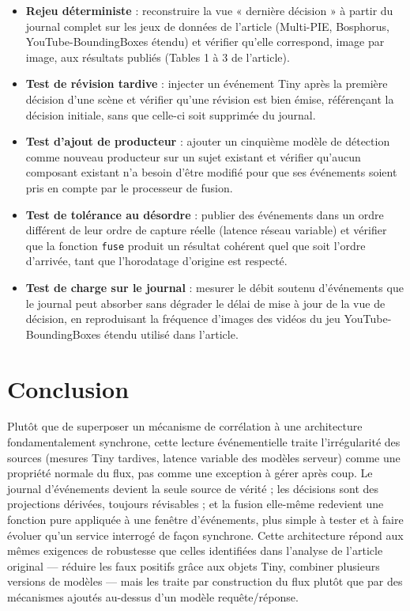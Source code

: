 \documentclass[11pt,a4paper]{article}
\begin{document}
\begin{itemize}[leftmargin=1.2cm]
  \item \textbf{Rejeu déterministe} : reconstruire la vue « dernière décision » à partir du
  journal complet sur les jeux de données de l'article (Multi-PIE, Bosphorus,
  YouTube-BoundingBoxes étendu) et vérifier qu'elle correspond, image par image, aux résultats
  publiés (Tables 1 à 3 de l'article).
  \item \textbf{Test de révision tardive} : injecter un événement Tiny après la première
  décision d'une scène et vérifier qu'une révision est bien émise, référençant la décision
  initiale, sans que celle-ci soit supprimée du journal.
  \item \textbf{Test d'ajout de producteur} : ajouter un cinquième modèle de détection comme
  nouveau producteur sur un sujet existant et vérifier qu'aucun composant existant n'a besoin
  d'être modifié pour que ses événements soient pris en compte par le processeur de fusion.
  \item \textbf{Test de tolérance au désordre} : publier des événements dans un ordre différent
  de leur ordre de capture réelle (latence réseau variable) et vérifier que la fonction
  \texttt{fuse} produit un résultat cohérent quel que soit l'ordre d'arrivée, tant que
  l'horodatage d'origine est respecté.
  \item \textbf{Test de charge sur le journal} : mesurer le débit soutenu d'événements que le
  journal peut absorber sans dégrader le délai de mise à jour de la vue de décision, en
  reproduisant la fréquence d'images des vidéos du jeu YouTube-BoundingBoxes étendu utilisé
  dans l'article.
\end{itemize}

\section{Conclusion}

Plutôt que de superposer un mécanisme de corrélation à une architecture fondamentalement
synchrone, cette lecture événementielle traite l'irrégularité des sources (mesures Tiny
tardives, latence variable des modèles serveur) comme une propriété normale du flux, pas comme
une exception à gérer après coup. Le journal d'événements devient la seule source de vérité ;
les décisions sont des projections dérivées, toujours révisables ; et la fusion elle-même
redevient une fonction pure appliquée à une fenêtre d'événements, plus simple à tester et à
faire évoluer qu'un service interrogé de façon synchrone. Cette architecture répond aux mêmes
exigences de robustesse que celles identifiées dans l'analyse de l'article original --- réduire
les faux positifs grâce aux objets Tiny, combiner plusieurs versions de modèles --- mais les
traite par construction du flux plutôt que par des mécanismes ajoutés au-dessus d'un modèle
requête/réponse.
\end{document}
